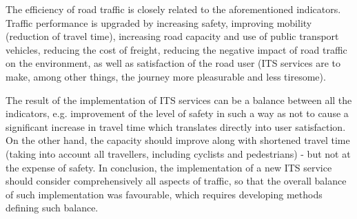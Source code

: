 The efficiency of road traffic is closely related to the aforementioned indicators. Traffic performance is upgraded by increasing safety, improving mobility (reduction of travel time), increasing road capacity and use of public transport vehicles, reducing the cost of freight, reducing the negative impact of road traffic on the environment, as well as satisfaction of the road user (ITS services are to make, among other things, the journey more pleasurable and less tiresome).

The result of the implementation of ITS services can be a balance between all the indicators, e.g. improvement of the level of safety in such a way as not to cause a significant increase in travel time which translates directly into user satisfaction. On the other hand, the capacity should improve along with shortened travel time (taking into account all travellers, including cyclists and pedestrians) - but not at the expense of safety. In conclusion, the implementation of a new ITS service should consider comprehensively all aspects of traffic, so that the overall balance of such implementation was favourable, which requires developing methods defining such balance. \cite{web002}


